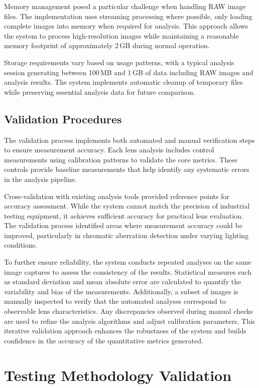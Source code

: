 Memory management posed a particular challenge when handling RAW image files. The implementation uses streaming processing where possible, only loading complete images into memory when required for analysis. This approach allows the system to process high-resolution images while maintaining a reasonable memory footprint of approximately 2\,GB during normal operation.

Storage requirements vary based on usage patterns, with a typical analysis session generating between 100\,MB and 1\,GB of data including RAW images and analysis results. The system implements automatic cleanup of temporary files while preserving essential analysis data for future comparison.

\subsection{Validation Procedures}
The validation process implements both automated and manual verification steps to ensure measurement accuracy. Each lens analysis includes control measurements using calibration patterns to validate the core metrics. These controls provide baseline measurements that help identify any systematic errors in the analysis pipeline.

Cross-validation with existing analysis tools provided reference points for accuracy assessment. While the system cannot match the precision of industrial testing equipment, it achieves sufficient accuracy for practical lens evaluation. The validation process identified areas where measurement accuracy could be improved, particularly in chromatic aberration detection under varying lighting conditions.

To further ensure reliability, the system conducts repeated analyses on the same image captures to assess the consistency of the results. Statistical measures such as standard deviation and mean absolute error are calculated to quantify the variability and bias of the measurements. Additionally, a subset of images is manually inspected to verify that the automated analyses correspond to observable lens characteristics. Any discrepancies observed during manual checks are used to refine the analysis algorithms and adjust calibration parameters. This iterative validation approach enhances the robustness of the system and builds confidence in the accuracy of the quantitative metrics generated.

\section{Testing Methodology Validation}

